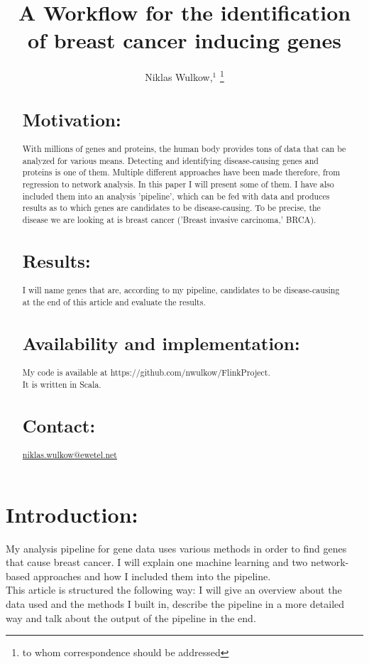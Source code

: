 \documentclass{bioinfo}
\begin{document}

\title[]{A Workflow for the identification of breast cancer inducing genes}
\author[Niklas Wulkow]{Niklas Wulkow,$^{1}$
\footnote{to whom correspondence should be addressed}}
\address{$^{1}$Freie Universit{\"a}t Berlin}

\history{}

\editor{}

\maketitle
\begin{abstract}

\section{Motivation:}
With millions of genes and proteins, the human body provides tons of data that can be analyzed for various means. Detecting and identifying disease-causing genes and proteins is one of them. Multiple different approaches have been made therefore, from regression to network analysis. In this paper I will present some of them. I have also included them into an analysis 'pipeline', which can be fed with data and produces results as to which genes are candidates to be disease-causing. To be precise, the disease we are looking at is breast cancer ('Breast invasive carcinoma,' BRCA).

\section{Results:}
I will name genes that are, according to my pipeline, candidates to be disease-causing at the end of this article and evaluate the results.

\section{Availability and implementation:}
My code is available at
https://github.com/nwulkow/FlinkProject.\\
It is written in Scala.

\section{Contact:} \href{}{niklas.wulkow@ewetel.net}
\end{abstract}

\section{Introduction:}
My analysis pipeline for gene data uses various methods in order to find genes that cause breast cancer. I will explain one machine learning and two network-based approaches and how I included them into the pipeline.\\
This article is structured the following way: I will give an overview about the data used and the methods I built in, describe the pipeline in a more detailed way and talk about the output of the pipeline in the end. 
\end{document}
